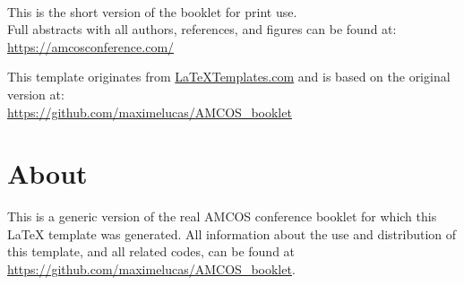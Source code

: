 \documentclass[
	openany, %
	parskip=full, %
	12pt, %
	a4paper, %
]{conferencebooklet} %
\begin{document}



\thispagestyle{empty} %

~\vfill %

\begin{center}	
	This is the short version of the booklet for print use. \\ Full abstracts with all authors, references, and figures can be found at:\\ \url{https://amcosconference.com/}
	
	This template originates from \url{LaTeXTemplates.com} and is based on the original version at:\\ \url{https://github.com/maximelucas/AMCOS\_booklet}
\end{center}

\newpage


\tableofcontents


\chapter{About}

{\small \textcolor{myblue}{This is a generic version of the real AMCOS conference booklet for which this \LaTeX{} template was generated. All information about the use and distribution of this template, and all related codes, can be found at \url{https://github.com/maximelucas/AMCOS\_booklet}.}}
\end{document}
